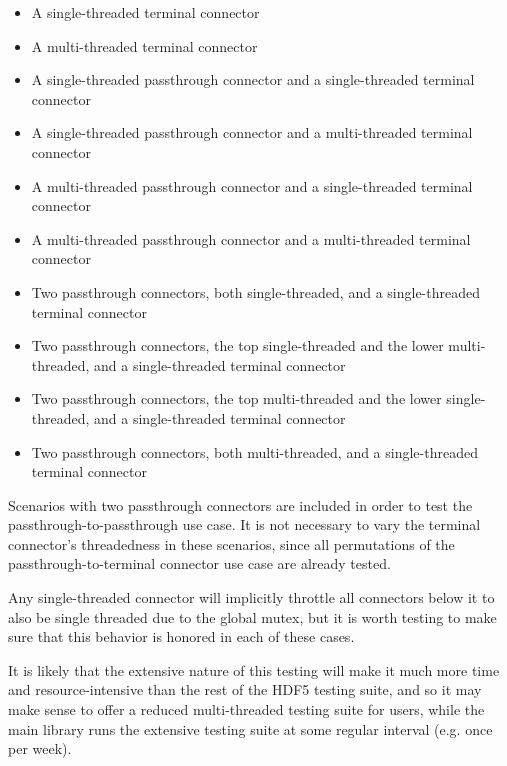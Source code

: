 \documentclass{article}
\begin{document}
\begin{itemize}
    \item A single-threaded terminal connector
    \item A multi-threaded terminal connector
    \item A single-threaded passthrough connector and a single-threaded terminal connector
    \item A single-threaded passthrough connector and a multi-threaded terminal connector

    \item A multi-threaded passthrough connector and a single-threaded terminal connector
    \item A multi-threaded passthrough connector and a multi-threaded terminal connector

    \item Two passthrough connectors, both single-threaded, and a single-threaded terminal connector

    \item Two passthrough connectors, the top single-threaded and the lower multi-threaded, and a single-threaded terminal connector
    
    \item Two passthrough connectors, the top multi-threaded and the lower single-threaded, and a single-threaded terminal connector
        
    \item Two passthrough connectors, both multi-threaded, and a single-threaded terminal connector
\end{itemize}  

Scenarios with two passthrough connectors are included in order to test the passthrough-to-passthrough use case. It is not necessary to vary the terminal connector's threadedness in these scenarios, since all permutations of the passthrough-to-terminal connector use case are already tested.

Any single-threaded connector will implicitly throttle all connectors below it to also be single threaded due to the global mutex, but it is worth testing to make sure that this behavior is honored in each of these cases.

It is likely that the extensive nature of this testing will make it much more time and resource-intensive than the rest of the HDF5 testing suite, and so it may make sense to offer a reduced multi-threaded testing suite for users, while the main library runs the extensive testing suite at some regular interval (e.g. once per week).
\end{document}
